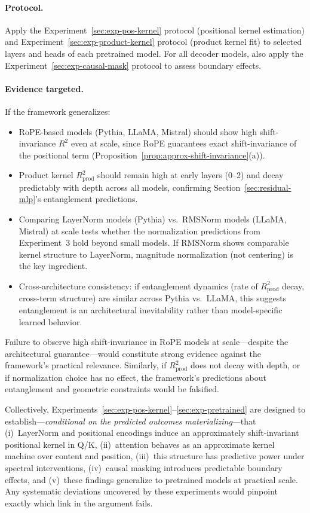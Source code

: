 \documentclass[11pt]{article}
\theoremstyle{definition}
\begin{document}
\paragraph{Protocol.}
Apply the Experiment~\ref{sec:exp-pos-kernel} protocol (positional kernel estimation) and Experiment~\ref{sec:exp-product-kernel} protocol (product kernel fit) to selected layers and heads of each pretrained model. For all decoder models, also apply the Experiment~\ref{sec:exp-causal-mask} protocol to assess boundary effects.

\paragraph{Evidence targeted.}
If the framework generalizes:
\begin{itemize}
    \item RoPE-based models (Pythia, LLaMA, Mistral) should show high shift-invariance $R^2$ even at scale, since RoPE guarantees exact shift-invariance of the positional term (Proposition~\ref{prop:approx-shift-invariance}(a)).
    \item Product kernel $R^2_{\text{prod}}$ should remain high at early layers (0--2) and decay predictably with depth across all models, confirming Section~\ref{sec:residual-mlp}'s entanglement predictions.
    \item Comparing LayerNorm models (Pythia) vs.\ RMSNorm models (LLaMA, Mistral) at scale tests whether the normalization predictions from Experiment~3 hold beyond small models. If RMSNorm shows comparable kernel structure to LayerNorm, magnitude normalization (not centering) is the key ingredient.
    \item Cross-architecture consistency: if entanglement dynamics (rate of $R^2_{\text{prod}}$ decay, cross-term structure) are similar across Pythia vs.\ LLaMA, this suggests entanglement is an architectural inevitability rather than model-specific learned behavior.
\end{itemize}
Failure to observe high shift-invariance in RoPE models at scale---despite the architectural guarantee---would constitute strong evidence against the framework's practical relevance. Similarly, if $R^2_{\text{prod}}$ does not decay with depth, or if normalization choice has no effect, the framework's predictions about entanglement and geometric constraints would be falsified.

\medskip
\noindent
Collectively, Experiments~\ref{sec:exp-pos-kernel}--\ref{sec:exp-pretrained} are designed to establish---\emph{conditional on the predicted outcomes materializing}---that (i)~LayerNorm and positional encodings induce an approximately shift-invariant positional kernel in Q/K, (ii)~attention behaves as an approximate kernel machine over content and position, (iii)~this structure has predictive power under spectral interventions, (iv)~causal masking introduces predictable boundary effects, and (v)~these findings generalize to pretrained models at practical scale. Any systematic deviations uncovered by these experiments would pinpoint exactly which link in the argument fails.
\end{document}
